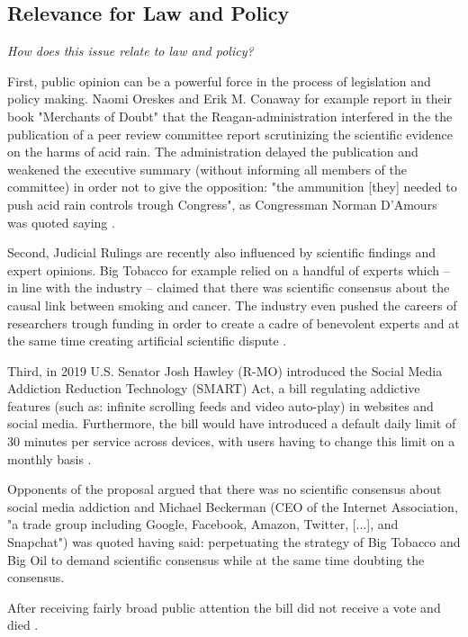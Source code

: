 \subsection{Relevance for Law and Policy}
\textit{How does this issue relate to law and policy?}

First, public opinion can be a powerful force in the process of legislation and policy making. 
Naomi Oreskes and Erik M. Conaway for example report in their book "Merchants of Doubt" that the Reagan-administration interfered in the the publication of a peer review committee report scrutinizing the scientific evidence on the harms of acid rain.
The administration delayed the publication and weakened the executive summary (without informing all members of the committee) in order not to give the opposition: "the ammunition [they] needed to push acid rain controls trough Congress", as Congressman Norman D'Amours was quoted saying \citep[p. 95 ff.]{oreskes_merchants_2010}.

Second, Judicial Rulings are recently also influenced by scientific findings and expert opinions. Big Tobacco for example relied on a handful of experts which -- in line with the industry -- claimed that there was scientific consensus about the causal link between smoking and cancer. 
The industry even pushed the careers of  researchers trough funding in order to create a cadre of benevolent experts and at the same time creating artificial scientific dispute \citep{oreskes_merchants_2010}.

Third, in 2019 U.S. Senator Josh Hawley (R-MO) introduced the Social Media Addiction Reduction Technology (SMART) Act, a bill regulating addictive features (such as: infinite scrolling feeds and  video auto-play) in websites and social media. 
Furthermore, the bill would have introduced a default daily limit of 30 minutes per service across devices, with users having to change this limit on a monthly basis \citep{hawley_social_2019}.

Opponents of the proposal argued that there was no scientific consensus about social media addiction and  Michael Beckerman (CEO of the Internet Association, "a trade group including Google, Facebook, Amazon, Twitter, [...], and Snapchat"\citep{rifkin_social_2019}) was quoted having said:  \citep{stewart_josh_2019} perpetuating the strategy of Big Tobacco and Big Oil to demand scientific consensus while at the same time doubting the consensus.

After receiving fairly broad public attention \citep{rosen_smart_2019, chen_new_2019, clukey_lawmaker_2019} the bill did not receive a vote and died \citep{govtrackus_smart_nodate}.

